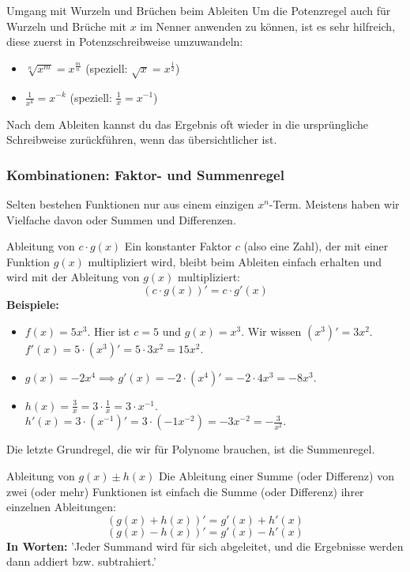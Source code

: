 \begin{tippumgebung}{Umgang mit Wurzeln und Brüchen beim Ableiten}
Um die Potenzregel auch für Wurzeln und Brüche mit $x$ im Nenner anwenden zu können, ist es sehr hilfreich, diese zuerst in Potenzschreibweise umzuwandeln:
\begin{itemize}
    \item $\sqrt[n]{x^m} = x^{\frac{m}{n}}$ (speziell: $\sqrt{x} = x^{\frac{1}{2}}$)
    \item $\frac{1}{x^k} = x^{-k}$ (speziell: $\frac{1}{x} = x^{-1}$)
\end{itemize}
Nach dem Ableiten kannst du das Ergebnis oft wieder in die ursprüngliche Schreibweise zurückführen, wenn das übersichtlicher ist.
\end{tippumgebung}

\subsubsection{Kombinationen: Faktor- und Summenregel}

Selten bestehen Funktionen nur aus einem einzigen $x^n$-Term. Meistens haben wir Vielfache davon oder Summen und Differenzen.

\begin{merksatzumgebung}[Faktorregel]{Ableitung von $c \cdot g(x)$}
Ein konstanter Faktor $c$ (also eine Zahl), der mit einer Funktion $g(x)$ multipliziert wird, bleibt beim Ableiten einfach erhalten und wird mit der Ableitung von $g(x)$ multipliziert:
\[ (c \cdot g(x))' = c \cdot g'(x) \]
\textbf{Beispiele:}
\begin{itemize}
    \item $f(x) = 5x^3$. Hier ist $c=5$ und $g(x)=x^3$. Wir wissen $(x^3)'=3x^2$.
    $f'(x) = 5 \cdot (x^3)' = 5 \cdot 3x^2 = 15x^2$.
    \item $g(x) = -2x^4 \implies g'(x) = -2 \cdot (x^4)' = -2 \cdot 4x^3 = -8x^3$.
    \item $h(x) = \frac{3}{x} = 3 \cdot \frac{1}{x} = 3 \cdot x^{-1}$.
    $h'(x) = 3 \cdot (x^{-1})' = 3 \cdot (-1x^{-2}) = -3x^{-2} = -\frac{3}{x^2}$.
\end{itemize}
\end{merksatzumgebung}

Die letzte Grundregel, die wir für Polynome brauchen, ist die Summenregel.

\begin{merksatzumgebung}{Ableitung von $g(x) \pm h(x)$}
Die Ableitung einer Summe (oder Differenz) von zwei (oder mehr) Funktionen ist einfach die Summe (oder Differenz) ihrer einzelnen Ableitungen:
\[ (g(x) + h(x))' = g'(x) + h'(x) \]
\[ (g(x) - h(x))' = g'(x) - h'(x) \]
\textbf{In Worten:} 'Jeder Summand wird für sich abgeleitet, und die Ergebnisse werden dann addiert bzw. subtrahiert.'
\end{merksatzumgebung}

